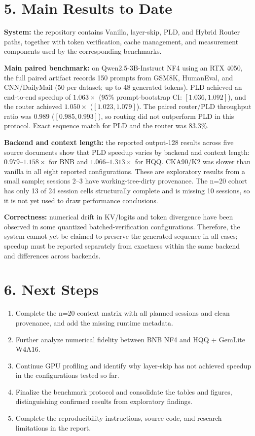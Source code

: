 \section*{5. Main Results to Date}
\textbf{System:} the repository contains Vanilla, layer-skip, PLD, and Hybrid Router paths, together with token verification, cache management, and measurement components used by the corresponding benchmarks.

\textbf{Main paired benchmark:} on Qwen2.5-3B-Instruct NF4 using an RTX 4050, the full paired artifact records 150 prompts from GSM8K, HumanEval, and CNN/DailyMail (50 per dataset; up to 48 generated tokens). PLD achieved an end-to-end speedup of $1.063\times$ (95\% prompt-bootstrap CI: $[1.036,1.092]$), and the router achieved $1.050\times$ ($[1.023,1.079]$). The paired router/PLD throughput ratio was $0.989$ ($[0.985,0.993]$), so routing did not outperform PLD in this protocol. Exact sequence match for PLD and the router was 83.3\%.

\textbf{Backend and context length:} the reported output-128 results across five source documents show that PLD speedup varies by backend and context length: $0.979$--$1.158\times$ for BNB and $1.066$--$1.313\times$ for HQQ. CKA90/K2 was slower than vanilla in all eight reported configurations. These are exploratory results from a small sample; sessions 2--3 have working-tree-dirty provenance. The n=20 cohort has only 13 of 24 session cells structurally complete and is missing 10 sessions, so it is not yet used to draw performance conclusions.

\textbf{Correctness:} numerical drift in KV/logits and token divergence have been observed in some quantized batched-verification configurations. Therefore, the system cannot yet be claimed to preserve the generated sequence in all cases; speedup must be reported separately from exactness within the same backend and differences across backends.

\section*{6. Next Steps}
\begin{enumerate}
    \item Complete the n=20 context matrix with all planned sessions and clean provenance, and add the missing runtime metadata.
    \item Further analyze numerical fidelity between BNB NF4 and HQQ + GemLite W4A16.
    \item Continue GPU profiling and identify why layer-skip has not achieved speedup in the configurations tested so far.
    \item Finalize the benchmark protocol and consolidate the tables and figures, distinguishing confirmed results from exploratory findings.
    \item Complete the reproducibility instructions, source code, and research limitations in the report.
\end{enumerate}

